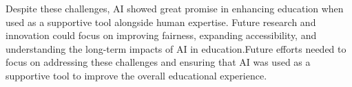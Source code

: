 \documentclass[conference]{IEEEtran}
\begin{document}
Despite these challenges, AI showed great promise in enhancing education when used as a supportive tool alongside human expertise. Future research and innovation could focus on improving fairness, expanding accessibility, and understanding the long-term impacts of AI in education.Future efforts needed to focus on addressing these challenges and ensuring that AI was used as a supportive tool to improve the overall educational experience.



\end{document}

